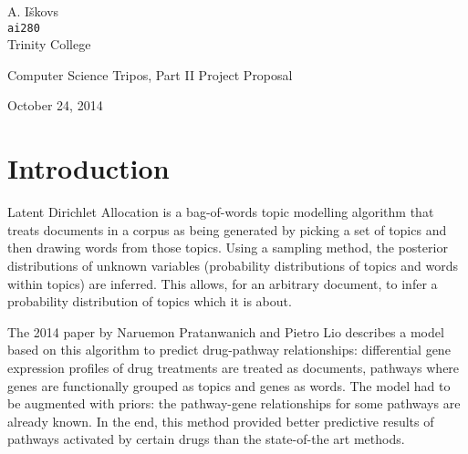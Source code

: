 \documentclass[12pt,a4]{article}
\begin{document}
\vfil


\begin{flushright}
\large{A. I\v{s}kovs}\\
\texttt{ai280}\\
Trinity College
\end{flushright}

\vspace*{\fill}
\begin{center}{\large Computer Science Tripos, Part II Project Proposal}

\vspace{0.3in}
\textbf{}

\vspace{0.4in}
\centerline{\large October 24, 2014}
\end{center}
\vspace*{\fill}

\vfil

%
%
%
%
%
% 
%

\pagebreak


\section*{Introduction}

Latent Dirichlet Allocation\cite{Blei} is a bag-of-words topic modelling algorithm that treats documents in a corpus as being generated by picking a set of topics and then drawing words from those topics. Using a sampling method, the posterior distributions of unknown variables (probability distributions of topics and words within topics) are inferred. This allows, for an arbitrary document, to infer a probability distribution of topics which it is about.

The 2014 paper\cite{Pratanwanich2014} by Naruemon Pratanwanich and Pietro Lio describes a model based on this algorithm to predict drug-pathway relationships: differential gene expression profiles of drug treatments are treated as documents, pathways where genes are functionally grouped as topics and genes as words. The model had to be augmented with priors: the pathway-gene relationships for some pathways are already known. In the end, this method provided better predictive results of pathways activated by certain drugs than the state-of-the art methods.
\end{document}
